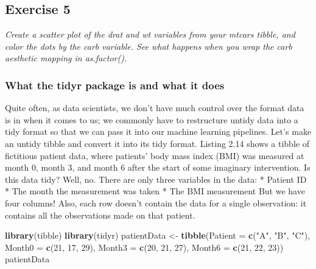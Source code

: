 \documentclass[
]{article}
\newenvironment{Shaded}{\begin{snugshade}}{\end{snugshade}}
\newcommand{\AttributeTok}[1]{\textcolor[rgb]{0.13,0.29,0.53}{#1}}
\newcommand{\DecValTok}[1]{\textcolor[rgb]{0.00,0.00,0.81}{#1}}
\newcommand{\FunctionTok}[1]{\textcolor[rgb]{0.13,0.29,0.53}{\textbf{#1}}}
\newcommand{\NormalTok}[1]{#1}
\newcommand{\OtherTok}[1]{\textcolor[rgb]{0.56,0.35,0.01}{#1}}
\newcommand{\StringTok}[1]{\textcolor[rgb]{0.31,0.60,0.02}{#1}}
\begin{document}
\subsection{Exercise 5}\label{exercise-5}

\emph{Create a scatter plot of the drat and wt variables from your
mtcars tibble, and color the dots by the carb variable. See what happens
when you wrap the carb aesthetic mapping in as.factor().}

\subsubsection{What the tidyr package is and what it
does}\label{what-the-tidyr-package-is-and-what-it-does}

Quite often, as data scientists, we don't have much control over the
format data is in when it comes to us; we commonly have to restructure
untidy data into a tidy format so that we can pass it into our machine
learning pipelines. Let's make an untidy tibble and convert it into its
tidy format. Listing 2.14 shows a tibble of fictitious patient data,
where patients' body mass index (BMI) was measured at month 0, month 3,
and month 6 after the start of some imaginary intervention. Is this data
tidy? Well, no. There are only three variables in the data: * Patient ID
* The month the measurement was taken * The BMI measurement But we have
four columns! Also, each row doesn't contain the data for a single
observation: it contains all the observations made on that patient.

\begin{Shaded}
\begin{Highlighting}[]
\FunctionTok{library}\NormalTok{(tibble)}
\FunctionTok{library}\NormalTok{(tidyr)}
\NormalTok{patientData }\OtherTok{\textless{}{-}} \FunctionTok{tibble}\NormalTok{(}\AttributeTok{Patient =} \FunctionTok{c}\NormalTok{(}\StringTok{"A"}\NormalTok{, }\StringTok{"B"}\NormalTok{, }\StringTok{"C"}\NormalTok{),}
                      \AttributeTok{Month0 =} \FunctionTok{c}\NormalTok{(}\DecValTok{21}\NormalTok{, }\DecValTok{17}\NormalTok{, }\DecValTok{29}\NormalTok{),}
                      \AttributeTok{Month3 =} \FunctionTok{c}\NormalTok{(}\DecValTok{20}\NormalTok{, }\DecValTok{21}\NormalTok{, }\DecValTok{27}\NormalTok{),}
                      \AttributeTok{Month6 =} \FunctionTok{c}\NormalTok{(}\DecValTok{21}\NormalTok{, }\DecValTok{22}\NormalTok{, }\DecValTok{23}\NormalTok{))}
\NormalTok{patientData}
\end{Highlighting}
\end{Shaded}
\end{document}
